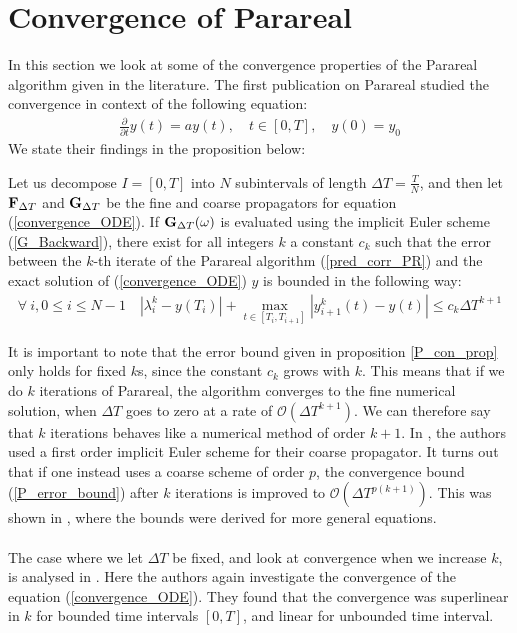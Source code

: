 \section{Convergence of Parareal}
In this section we look at some of the convergence properties of the Parareal algorithm given in the literature. The first publication on Parareal \cite{lions2001resolution} studied the convergence in context of the following equation: 
\begin{align}
\frac{\partial}{\partial t} y(t)=ay(t),\quad t\in [0,T],\quad y(0)=y_0\label{convergence_ODE}
\end{align}
We state their findings in the proposition below:
\begin{proposition} \label{P_con_prop}
Let us decompose $I=[0,T]$ into $N$ subintervals of length $\Delta T = \frac{T}{N}$, and then let $\bold F_{\Delta T}$ and $\bold G_{\Delta T}$ be the fine and coarse propagators for equation (\ref{convergence_ODE}). If $\bold G_{\Delta T}(\omega)$  is evaluated using the implicit Euler scheme (\ref{G_Backward}), there exist for all integers $k$ a constant $c_k$ such that the error between the $k$-th iterate of the Parareal algorithm (\ref{pred_corr_PR}) and the exact solution of (\ref{convergence_ODE}) $y$ is bounded in the following way:
\begin{align}
\forall \ i,0\leq i\leq N-1 \quad |\lambda_{i}^k-y(T_i)| + \max_{t\in[T_{i},T_{i+1}]}|y_{i+1}^k(t)-y(t)| \leq c_k\Delta T^{k+1} \label{P_error_bound}
\end{align}
\end{proposition}
\noindent
It is important to note that the error bound given in proposition \ref{P_con_prop} only holds for fixed $k$s, since the constant $c_k$ grows with $k$. This means that if we do $k$ iterations of Parareal, the algorithm converges to the  fine numerical solution, when $\Delta T$ goes to zero at a rate of $\mathcal{O}(\Delta T^{k+1})$. We can therefore say that $k$ iterations behaves like a numerical method of order $k+1$. In \cite{lions2001resolution}, the authors used a first order implicit Euler scheme for their coarse propagator. It turns out that if one instead uses a coarse scheme of order $p$, the convergence bound (\ref{P_error_bound}) after $k$ iterations is improved to $\mathcal{O}(\Delta T^{p(k+1)})$. This was shown in \cite{bal2005convergence}, where the bounds were derived for more general equations. 
\\
\\
The case where we let $\Delta T$ be fixed, and look at convergence when we increase $k$, is analysed in \cite{gander2007analysis}. Here the authors again investigate the convergence of the equation (\ref{convergence_ODE}). They found that the convergence was superlinear in $k$ for bounded time intervals $[0,T]$, and linear for unbounded time interval. 
